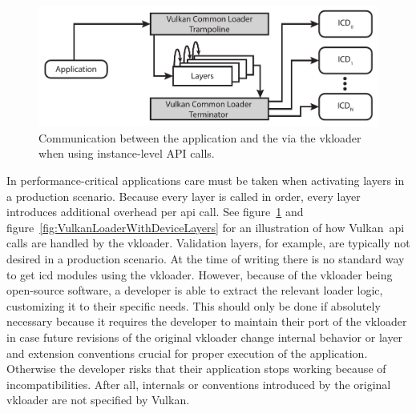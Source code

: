       \begin{figure}
        \includegraphics[width=1.0\textwidth]{Main/Images/VulkanLoaderInstanceLayers}
        \centering
        \caption{Communication between the application and the  via the \gls{vkloader} when using instance-level API calls.}
        \label{fig:VulkanLoaderWithInstanceLayers}
      \end{figure}

      In performance-critical applications care must be taken when activating layers in a production scenario.
      Because every layer is called in order, every layer introduces additional overhead per \gls{api} call.
      See figure~\ref{fig:VulkanLoaderWithInstanceLayers} and figure~\ref{fig:VulkanLoaderWithDeviceLayers} for an illustration of how Vulkan~\gls{api} calls are handled by the \gls{vkloader}.
      Validation layers, for example, are typically not desired in a production scenario.
      At the time of writing there is no standard way to get \gls{icd} modules using the \gls{vkloader}.
      However, because of the \gls{vkloader} being open-source software, a developer is able to extract the relevant loader logic, customizing it to their specific needs.
      This should only be done if absolutely necessary because it requires the developer to maintain their port of the \gls{vkloader} in case future revisions of the original \gls{vkloader} change internal behavior or layer and extension conventions crucial for proper execution of the application.
      Otherwise the developer risks that their application stops working because of incompatibilities.
      After all, internals or conventions introduced by the original \gls{vkloader} are not specified by Vulkan.



